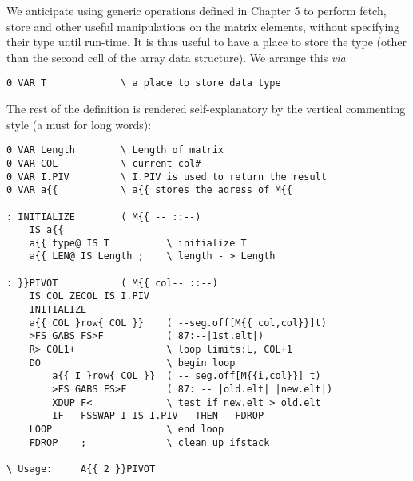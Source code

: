 We anticipate using generic operations  defined in Chapter 5 
to perform fetch, store and other useful manipulations on the
matrix elements, without specifying their type until run-time.
It is thus useful to have a place to store the type (other than the
second cell of the array data structure). We arrange this \textit{via}
\begin{verbatim}
0 VAR T             \ a place to store data type
\end{verbatim}
The rest of the definition is rendered self-explanatory by the 
vertical commenting style (a must for long words):
\begin{verbatim}
0 VAR Length        \ Length of matrix
0 VAR COL           \ current col#
0 VAR I.PIV         \ I.PIV is used to return the result
0 VAR a{{           \ a{{ stores the adress of M{{

: INITIALIZE        ( M{{ -- ::--)
    IS a{{
    a{{ type@ IS T          \ initialize T
    a{{ LEN@ IS Length ;    \ length - > Length

: }}PIVOT           ( M{{ col-- ::--)
    IS COL ZECOL IS I.PIV
    INITIALIZE
    a{{ COL }row{ COL }}    ( --seg.off[M{{ col,col}}]t)
    >FS GABS FS>F           ( 87:--|1st.elt|)
    R> COL1+                \ loop limits:L, COL+1
    DO                      \ begin loop
        a{{ I }row{ COL }}  ( -- seg.off[M{{i,col}}] t)
        >FS GABS FS>F       ( 87: -- |old.elt| |new.elt|)
        XDUP F<             \ test if new.elt > old.elt
        IF   FSSWAP I IS I.PIV   THEN   FDROP
    LOOP                    \ end loop
    FDROP    ;              \ clean up ifstack

\ Usage:     A{{ 2 }}PIVOT
\end{verbatim}
